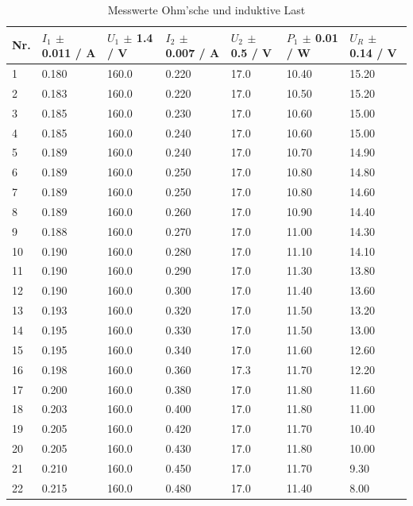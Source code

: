 \documentclass[12pt,a4paper,twoside]{article}
\begin{document}
\begin{table}[H]
    \centering
    \caption{Messwerte Ohm'sche und induktive Last}
    \label{tab:messwerteOhmInduktiv}
    \begin{tabular}{| l | l | l | l | l | l | l |}
        \hline
        Nr. & $I_{1}$ $\pm$ 0.011 / A & $U_{1}$ $\pm$ 1.4 / V & $I_{2}$ $\pm$ 0.007 / A & $U_{2}$ $\pm$ 0.5 / V & $P_{1}$ $\pm$ 0.01 / W & $U_{R}$ $\pm$ 0.14 / V \\
        \hline
        1 & 0.180 & 160.0 & 0.220 & 17.0 & 10.40 & 15.20 \\
        2 & 0.183 & 160.0 & 0.220 & 17.0 & 10.50 & 15.20 \\
        3 & 0.185 & 160.0 & 0.230 & 17.0 & 10.60 & 15.00 \\
        4 & 0.185 & 160.0 & 0.240 & 17.0 & 10.60 & 15.00 \\
        5 & 0.189 & 160.0 & 0.240 & 17.0 & 10.70 & 14.90 \\
        6 & 0.189 & 160.0 & 0.250 & 17.0 & 10.80 & 14.80 \\
        7 & 0.189 & 160.0 & 0.250 & 17.0 & 10.80 & 14.60 \\
        8 & 0.189 & 160.0 & 0.260 & 17.0 & 10.90 & 14.40 \\
        9 & 0.188 & 160.0 & 0.270 & 17.0 & 11.00 & 14.30 \\
        10 & 0.190 & 160.0 & 0.280 & 17.0 & 11.10 & 14.10 \\
        11 & 0.190 & 160.0 & 0.290 & 17.0 & 11.30 & 13.80 \\
        12 & 0.190 & 160.0 & 0.300 & 17.0 & 11.40 & 13.60 \\
        13 & 0.193 & 160.0 & 0.320 & 17.0 & 11.50 & 13.20 \\
        14 & 0.195 & 160.0 & 0.330 & 17.0 & 11.50 & 13.00 \\
        15 & 0.195 & 160.0 & 0.340 & 17.0 & 11.60 & 12.60 \\
        16 & 0.198 & 160.0 & 0.360 & 17.3 & 11.70 & 12.20 \\
        17 & 0.200 & 160.0 & 0.380 & 17.0 & 11.80 & 11.60 \\
        18 & 0.203 & 160.0 & 0.400 & 17.0 & 11.80 & 11.00 \\
        19 & 0.205 & 160.0 & 0.420 & 17.0 & 11.70 & 10.40 \\
        20 & 0.205 & 160.0 & 0.430 & 17.0 & 11.80 & 10.00 \\
        21 & 0.210 & 160.0 & 0.450 & 17.0 & 11.70 & 9.30 \\
        22 & 0.215 & 160.0 & 0.480 & 17.0 & 11.40 & 8.00 \\
        \hline
    \end{tabular}
\end{table}
\end{document}
